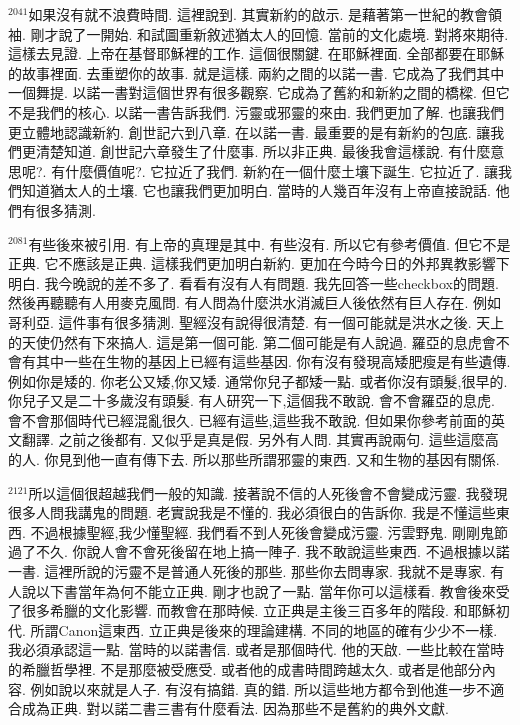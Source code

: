 \documentclass{book}
\begin{document}
$^{2041}$如果沒有就不浪費時間.
這裡說到.
其實新約的啟示.
是藉著第一世紀的教會領袖.
剛才說了一開始.
和試圖重新敘述猶太人的回憶.
當前的文化處境.
對將來期待.
這樣去見證.
上帝在基督耶穌裡的工作.
這個很關鍵.
在耶穌裡面.
全部都要在耶穌的故事裡面.
去重塑你的故事.
就是這樣.
兩約之間的以諾一書.
它成為了我們其中一個舞提.
以諾一書對這個世界有很多觀察.
它成為了舊約和新約之間的橋樑.
但它不是我們的核心.
以諾一書告訴我們.
污靈或邪靈的來由.
我們更加了解.
也讓我們更立體地認識新約.
創世記六到八章.
在以諾一書.
最重要的是有新約的包底.
讓我們更清楚知道.
創世記六章發生了什麼事.
所以非正典.
最後我會這樣說.
有什麼意思呢?.
有什麼價值呢?.
它拉近了我們.
新約在一個什麼土壤下誕生.
它拉近了.
讓我們知道猶太人的土壤.
它也讓我們更加明白.
當時的人幾百年沒有上帝直接說話.
他們有很多猜測.

$^{2081}$有些後來被引用.
有上帝的真理是其中.
有些沒有.
所以它有參考價值.
但它不是正典.
它不應該是正典.
這樣我們更加明白新約.
更加在今時今日的外邦異教影響下明白.
我今晚說的差不多了.
看看有沒有人有問題.
我先回答一些checkbox的問題.
然後再聽聽有人用麥克風問.
有人問為什麼洪水消滅巨人後依然有巨人存在.
例如哥利亞.
這件事有很多猜測.
聖經沒有說得很清楚.
有一個可能就是洪水之後.
天上的天使仍然有下來搞人.
這是第一個可能.
第二個可能是有人說過.
羅亞的息虎會不會有其中一些在生物的基因上已經有這些基因.
你有沒有發現高矮肥瘦是有些遺傳.
例如你是矮的.
你老公又矮,你又矮.
通常你兒子都矮一點.
或者你沒有頭髮,很早的.
你兒子又是二十多歲沒有頭髮.
有人研究一下,這個我不敢說.
會不會羅亞的息虎.
會不會那個時代已經混亂很久.
已經有這些,這些我不敢說.
但如果你參考前面的英文翻譯.
之前之後都有.
又似乎是真是假.
另外有人問.
其實再說兩句.
這些這麼高的人.
你見到他一直有傳下去.
所以那些所謂邪靈的東西.
又和生物的基因有關係.

$^{2121}$所以這個很超越我們一般的知識.
接著說不信的人死後會不會變成污靈.
我發現很多人問我講鬼的問題.
老實說我是不懂的.
我必須很白的告訴你.
我是不懂這些東西.
不過根據聖經,我少懂聖經.
我們看不到人死後會變成污靈.
污雲野鬼.
剛剛鬼節過了不久.
你說人會不會死後留在地上搞一陣子.
我不敢說這些東西.
不過根據以諾一書.
這裡所說的污靈不是普通人死後的那些.
那些你去問專家.
我就不是專家.
有人說以下書當年為何不能立正典.
剛才也說了一點.
當年你可以這樣看.
教會後來受了很多希臘的文化影響.
而教會在那時候.
立正典是主後三百多年的階段.
和耶穌初代.
所謂Canon這東西.
立正典是後來的理論建構.
不同的地區的確有少少不一樣.
我必須承認這一點.
當時的以諾書信.
或者是那個時代.
他的天啟.
一些比較在當時的希臘哲學裡.
不是那麼被受應受.
或者他的成書時間跨越太久.
或者是他部分內容.
例如說以來就是人子.
有沒有搞錯.
真的錯.
所以這些地方都令到他進一步不適合成為正典.
對以諾二書三書有什麼看法.
因為那些不是舊約的典外文獻.
\end{document}
